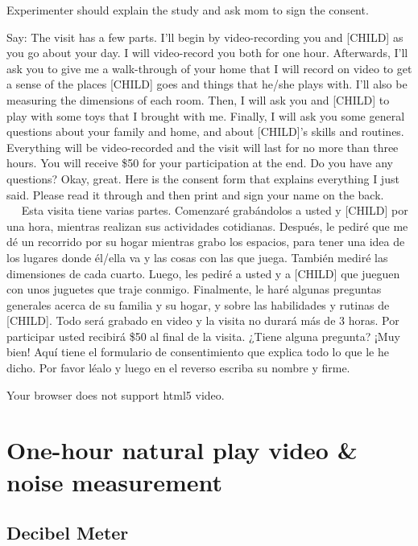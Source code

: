 \documentclass[
  12pt,
]{book}
\begin{document}
Experimenter should explain the study and ask mom to sign the consent.

Say: The visit has a few parts. I'll begin by video-recording you and {[}CHILD{]} as you go about your day. I will video-record you both for one hour. Afterwards, I'll ask you to give me a walk-through of your home that I will record on video to get a sense of the places {[}CHILD{]} goes and things that he/she plays with. I'll also be measuring the dimensions of each room. Then, I will ask you and {[}CHILD{]} to play with some toys that I brought with me. Finally, I will ask you some general questions about your family and home, and about {[}CHILD{]}'s skills and routines. Everything will be video-recorded and the visit will last for no more than three hours. You will receive \$50 for your participation at the end. Do you have any questions? Okay, great. Here is the consent form that explains everything I just said. Please read it through and then print and sign your name on the back.
    Esta visita tiene varias partes. Comenzaré grabándolos a usted y {[}CHILD{]} por una hora, mientras realizan sus actividades cotidianas. Después, le pediré que me dé un recorrido por su hogar mientras grabo los espacios, para tener una idea de los lugares donde él/ella va y las cosas con las que juega. También mediré las dimensiones de cada cuarto. Luego, les pediré a usted y a {[}CHILD{]} que jueguen con unos juguetes que traje conmigo. Finalmente, le haré algunas preguntas generales acerca de su familia y su hogar, y sobre las habilidades y rutinas de {[}CHILD{]}. Todo será grabado en video y la visita no durará más de 3 horas. Por participar usted recibirá \$50 al final de la visita. ¿Tiene alguna pregunta? ¡Muy bien! Aquí tiene el formulario de consentimiento que explica todo lo que le he dicho. Por favor léalo y luego en el reverso escriba su nombre y firme.

Your browser does not support html5 video.

\hypertarget{one-hour-natural-play-video-noise-measurement}{%
\section{One-hour natural play video \& noise measurement}\label{one-hour-natural-play-video-noise-measurement}}

\hypertarget{decibel-meter}{%
\subsection{Decibel Meter}\label{decibel-meter}}
\end{document}
